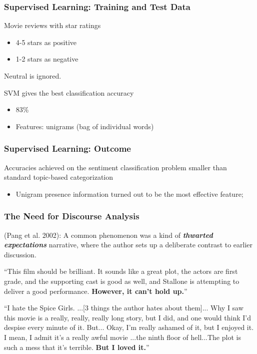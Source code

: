 \documentclass[t]{beamer}
\begin{document}
\begin{frame} \frametitle{Supervised Learning: Training and Test Data}


Movie reviews with star ratings
\begin{itemize}
\item 4-5 stars as positive 
\item 1-2 stars as negative
\end{itemize}

\vfill
Neutral is ignored. 

\vfill
SVM gives the best classification accuracy
\begin{itemize} 
\item 83\% 
\item Features: unigrams (bag of individual words)
\end{itemize}

\end{frame} 


\begin{frame} \frametitle{Supervised Learning: Outcome}

Accuracies achieved on the sentiment classification
problem smaller than standard topic-based 
categorization 
\begin{itemize}
\item Unigram presence information turned out to be the most
effective feature; 
\end{itemize}

\end{frame}


\begin{frame} \frametitle{The Need for Discourse Analysis}

(Pang et al. 2002): A common phenomenon was a kind of
\textbf{\em thwarted expectations} narrative, where the author sets up a
deliberate contrast to earlier discussion.


\begin{block}{}
  \small{ ``This film should be brilliant. It sounds like a great
    plot, the actors are first grade, and the supporting cast is good
    as well, and Stallone is attempting to deliver a good performance.
    \textbf{However, it can't hold up.}'' }

\end{block}

\vfill

\begin{block}{}
  \small{ ``I hate the Spice Girls.  ...[3 things the author hates
    about them]... Why I saw this movie is a really, really, really
    long story, but I did, and one would think I'd despise every
    minute of it. But... Okay, I'm really ashamed of it, but I enjoyed
    it. I mean, I admit it's a really awful movie ...the ninth floor
    of hell...The plot is such a mess that it's terrible.  \textbf{But I loved
    it.}''}
\end{block}

\end{frame}
\end{document}

